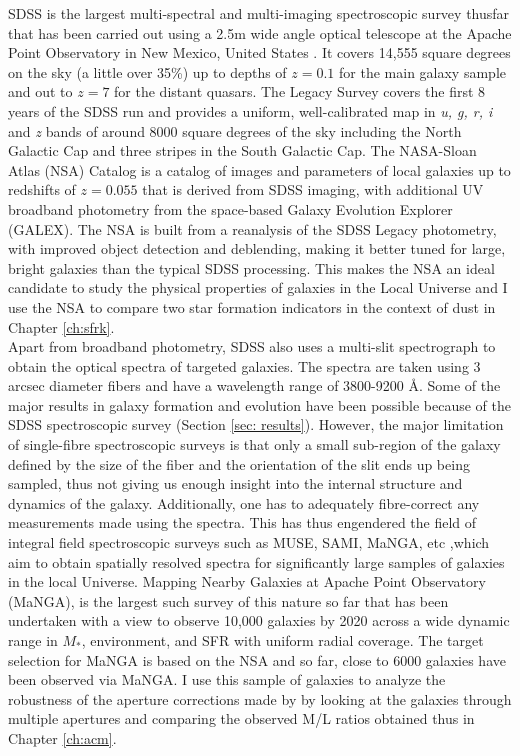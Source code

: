 SDSS is the largest multi-spectral and multi-imaging spectroscopic survey thusfar that has been carried out using a 2.5m wide angle optical telescope at the Apache Point Observatory \citet{2006AJ....131.2332G} in New Mexico, United States \citep{2000AJ....120.1579Y, 2002AJ....124.1810S}. It covers 14,555 square degrees on the sky (a little over 35\%) up to depths of $z= 0.1$ for the main galaxy sample and out to $z = 7$ for the distant quasars. The Legacy Survey covers the first 8 years of the SDSS run and provides a uniform, well-calibrated map in \emph{u, g, r, i} and \emph{z} bands of around 8000 square degrees of the sky including the North Galactic Cap and three stripes in the South Galactic Cap. The NASA-Sloan Atlas (NSA) Catalog is a catalog of images and parameters of local galaxies up to redshifts of $z = 0.055$ that is derived from SDSS imaging, with additional UV broadband photometry from the space-based Galaxy Evolution Explorer (GALEX). The NSA is built from a reanalysis \citet{2011AJ....142...31B} of the SDSS Legacy photometry, with improved object detection and deblending, making it better tuned for large, bright galaxies than the typical SDSS processing. This makes the NSA an ideal candidate to study the physical properties of galaxies in the Local Universe and I use the NSA to compare two star formation indicators in the context of dust in Chapter \ref{ch:sfrk}.\\

Apart from broadband photometry, SDSS also uses a multi-slit spectrograph \citet{2009ApJS..182..543A} to obtain the optical spectra of targeted galaxies. The spectra are taken using 3 arcsec diameter fibers and have a wavelength range of 3800-9200 \AA. Some of the major results in galaxy formation and evolution have been possible because of the SDSS spectroscopic survey (Section \ref{sec: results}). However, the major limitation of single-fibre spectroscopic surveys is that only a small sub-region of the galaxy defined by the size of the fiber and the orientation of the slit ends up being sampled, thus not giving us enough insight into the internal structure and dynamics of the galaxy. Additionally, one has to adequately fibre-correct any measurements made using the spectra. This has thus engendered the field of integral field spectroscopic surveys such as MUSE, SAMI, MaNGA, etc ,which aim to obtain spatially resolved spectra for significantly large samples of galaxies in the local Universe. Mapping Nearby Galaxies at Apache Point Observatory (MaNGA), is the largest such survey of this nature so far that has been undertaken with a view to observe 10,000 galaxies by 2020 across a wide dynamic range in $M_{*}$, environment, and SFR with uniform radial coverage. The target selection for MaNGA is based on the NSA and so far, close to 6000 galaxies have been observed via MaNGA. I use this sample of galaxies to analyze the robustness of the aperture corrections made by \citet{kauffmann_environmental_2004} by looking at the galaxies through multiple apertures and comparing the observed M/L ratios obtained thus in Chapter \ref{ch:acm}.\\

